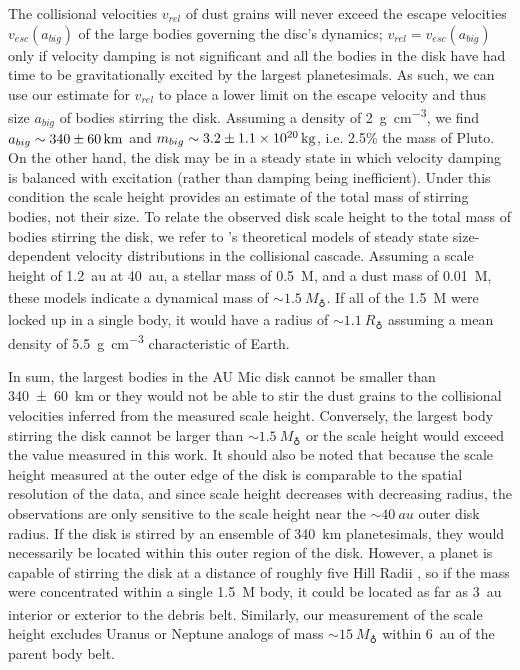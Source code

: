 \documentclass[12pt,oneside]{book}
\begin{document}
The collisional velocities $v_{rel}$ of dust grains will never exceed the escape velocities $v_{esc}(a_{big})$ of the large bodies governing the disc's dynamics; $v_{rel} = v_{esc}(a_{big})$ only if velocity damping is not significant and all the bodies in the disk have had time to be gravitationally excited by the largest planetesimals. 
As such, we can use our estimate for $v_{rel}$ to place a lower limit on the escape velocity and thus size $a_{big}$ of bodies stirring the disk.
Assuming a density of \SI{2}{\g.\cm^{-3}}, we find $a_{big} \sim \SI{340 \pm 60}{km}$ and $m_{big} \sim \SI{3.2 \pm 1.1e20}{kg}$, i.e. 2.5\% the mass of Pluto.
On the other hand, the disk may be in a steady state in which velocity damping is balanced with excitation (rather than damping being inefficient).
Under this condition the scale height provides an estimate of the total mass of stirring bodies, not their size.
To relate the observed disk scale height to the total mass of bodies stirring the disk, we refer to \cite{pan&schlichting12}'s theoretical models of steady state size-dependent velocity distributions in the collisional cascade.
Assuming a scale height of \SI{1.2}{au} at \SI{40}{au}, a stellar mass of \SI{0.5}{M_\sun}, and a dust mass of \SI{0.01}{M_\earth}, these models indicate a dynamical mass of $\sim\SI{1.5}{M_\earth}$.
If all of the \SI{1.5}{M_\earth} were locked up in a single body, it would have a radius of $\sim \SI{1.1}{R_\earth}$ assuming a mean density of \SI{5.5}{\g.\cm^{-3}} characteristic of Earth.

In sum, the largest bodies in the AU Mic disk cannot be smaller than \linebreak \SI{340 \pm 60}{km} or they would not be able to stir the dust grains to the collisional velocities inferred from the measured scale height.
Conversely, the largest body stirring the disk cannot be larger than $\sim \SI{1.5}{M_\earth}$ or the scale height would exceed the value measured in this work.
It should also be noted that because the scale height measured at the outer edge of the disk is comparable to the spatial resolution of the data, and since scale height decreases with decreasing radius, the observations are only sensitive to the scale height near the $\sim \SI{40}{au}$ outer disk radius. 
If the disk is stirred by an ensemble of \SI{340}{km} planetesimals, they would necessarily be located within this outer region of the disk. 
However, a planet is capable of stirring the disk at a distance of roughly five Hill Radii \citep{greenzweig&lissauer90}, so if the mass were concentrated within a single \SI{1.5}{M_\earth} body, it could be located as far as \SI{3}{au} interior or exterior to the debris belt. 
Similarly, our measurement of the scale height excludes Uranus or Neptune analogs of mass $\sim \SI{15}{M_\earth}$ within \SI{6}{au} of the parent body belt. 
\end{document}
